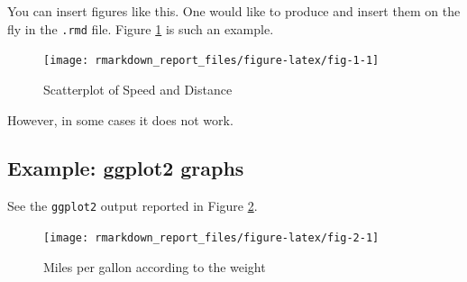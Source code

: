 \documentclass[
  12pt,
]{article}
\newenvironment{Shaded}{\begin{snugshade}}{\end{snugshade}}
\newcommand{\AttributeTok}[1]{\textcolor[rgb]{0.77,0.63,0.00}{#1}}
\newcommand{\CommentTok}[1]{\textcolor[rgb]{0.56,0.35,0.01}{\textit{#1}}}
\newcommand{\FunctionTok}[1]{\textcolor[rgb]{0.00,0.00,0.00}{#1}}
\newcommand{\NormalTok}[1]{#1}
\newcommand{\OtherTok}[1]{\textcolor[rgb]{0.56,0.35,0.01}{#1}}
\newcommand{\SpecialCharTok}[1]{\textcolor[rgb]{0.00,0.00,0.00}{#1}}
\newcommand{\StringTok}[1]{\textcolor[rgb]{0.31,0.60,0.02}{#1}}
\begin{document}
You can insert figures like this. One would like to produce and insert them on the fly in the \texttt{.rmd} file. Figure \ref{fig:fig-1} is such an example.

\begin{Shaded}
\end{Shaded}

\begin{figure}[H]

{\centering \texttt{[image: rmarkdown\_report\_files/figure-latex/fig-1-1]} 

}

\caption{Scatterplot of Speed and Distance}\label{fig:fig-1}
\end{figure}

However, in some cases it does not work.

\hypertarget{example-ggplot2-graphs}{%
\subsection{Example: ggplot2 graphs}\label{example-ggplot2-graphs}}

See the \texttt{ggplot2} output reported in Figure \ref{fig:fig-2}.

\begin{Shaded}
\end{Shaded}

\begin{figure}[H]

{\centering \texttt{[image: rmarkdown\_report\_files/figure-latex/fig-2-1]} 

}

\caption{Miles per gallon according to the weight}\label{fig:fig-2}
\end{figure}
\end{document}
